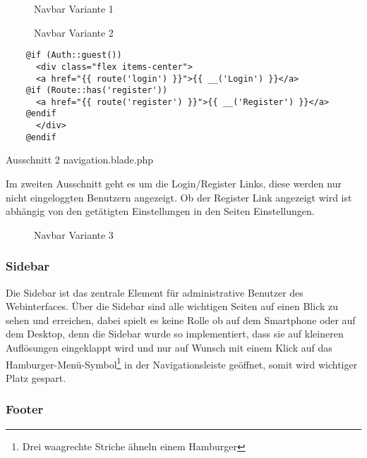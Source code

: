 \begin{figure}[H]
  \centering
  \caption{Navbar Variante 1}
\end{figure}

\begin{figure}[H]
  \centering
  \caption{Navbar Variante 2}
\end{figure}

\begin{listing}[H]
  \begin{verbatim}
    @if (Auth::guest())
      <div class="flex items-center">
      <a href="{{ route('login') }}">{{ __('Login') }}</a>
    @if (Route::has('register'))
      <a href="{{ route('register') }}">{{ __('Register') }}</a>
    @endif
      </div>
    @endif
  \end{verbatim}
  \caption{Ausschnitt 2 navigation.blade.php}
\end{listing}

Im zweiten Ausschnitt geht es um die Login/Register Links, diese werden nur
nicht eingeloggten Benutzern angezeigt. Ob der Register Link angezeigt wird ist
abhängig von den getätigten Einstellungen in den Seiten Einstellungen.

\begin{figure}[H]
  \centering
  \caption{Navbar Variante 3}
\end{figure}

\subsubsection{Sidebar}
Die Sidebar ist das zentrale Element für administrative Benutzer des
Webinterfaces. Über die Sidebar sind alle wichtigen Seiten auf einen Blick zu
sehen und erreichen, dabei spielt es keine Rolle ob auf dem Smartphone oder auf
dem Desktop, denn die Sidebar wurde so implementiert, dass sie auf kleineren
Auflösungen eingeklappt wird und nur auf Wunsch mit einem Klick auf das
Hamburger-Menü-Symbol\footnote{Drei waagrechte Striche ähneln einem Hamburger} in der Navigationsleiste geöffnet, somit wird wichtiger Platz gespart.

\subsubsection{Footer}

